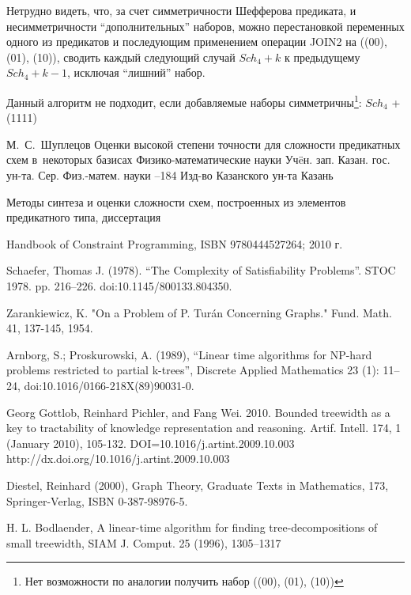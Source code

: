 \documentclass[12pt]{article}
\begin{document}
Нетрудно видеть, что, за счет симметричности Шефферова предиката, и несимметричности ``дополнительных'' наборов, можно 
перестановкой переменных одного из предикатов и последующим применением операции JOIN2 на ((00), (01), (10)), сводить 
каждый следующий случай $Sch_4 + k$ к предыдущему $Sch_4 + k-1$, исключая ``лишний'' набор.

Данный алгоритм не подходит, если добавляемые наборы симметричны\footnote{Нет возможности по аналогии
получить набор ((00), (01), (10))}: $Sch_4$ + (1111)
\clearpage
{}
    \by М.~С.~Шуплецов
    \paper Оценки высокой степени точности для сложности предикатных схем в~некоторых базисах
    \inbook Физико-математические науки
    \serial Уч\"eн. зап. Казан. гос. ун-та. Сер. Физ.-матем. науки
    --184
    \publ Изд-во Казанского ун-та
    \publaddr Казань

Методы синтеза и оценки сложности схем, построенных из элементов предикатного типа, диссертация

 Handbook of Constraint Programming, ISBN 9780444527264; 2010 г.

 Schaefer, Thomas J. (1978). 
``The Complexity of Satisfiability Problems''. STOC 1978. pp. 216–226. doi:10.1145/800133.804350.

 Zarankiewicz, K. "On a Problem of P. Turán Concerning Graphs." Fund. Math. 41, 137-145, 1954. 

 Arnborg, S.; Proskurowski, A. (1989), 
``Linear time algorithms for NP-hard problems restricted to partial k-trees'',
Discrete Applied Mathematics 23 (1): 11–24, doi:10.1016/0166-218X(89)90031-0.

Georg Gottlob, Reinhard Pichler, and Fang Wei. 2010. Bounded treewidth as a key to tractability of knowledge representation and reasoning. Artif. Intell. 174, 1 (January 2010), 105-132. DOI=10.1016/j.artint.2009.10.003 http://dx.doi.org/10.1016/j.artint.2009.10.003

Diestel, Reinhard (2000), Graph Theory, Graduate Texts in Mathematics, 
173, Springer-Verlag, ISBN 0-387-98976-5.

H. L. Bodlaender, A linear-time algorithm for finding 
tree-decompositions of small
treewidth, SIAM J. Comput. 25 (1996), 1305–1317


\endthebibliography
\end{document}
